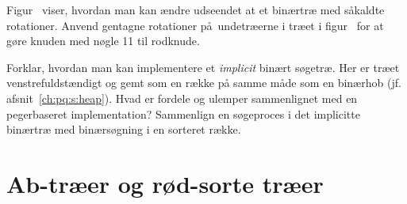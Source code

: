 \begin{exerc} 
  Figur~ viser, hvordan man kan ændre udseendet at et binærtræ med såkaldte rotationer. 
  Anvend gentagne rotationer på undetræerne i træet i figur~ for at gøre knuden med nøgle 11 til rodknude.
\end{exerc}

\begin{exerc}
  Forklar, hvordan man kan implementere et \emph{implicit}
  binært søgetræ.
  Her er træet venstrefuldstændigt 
   og gemt som en række på samme måde som en binærhob (jf. afsnit~\ref{ch:pq:s:heap}).
  Hvad er fordele og ulemper sammenlignet med en pegerbaseret implementation?
  Sammenlign en søgeproces i det implicitte binærtræ med binærsøgning i en sorteret række.
\end{exerc}

\section{Ab-træer og rød-sorte træer}
%
%
%


